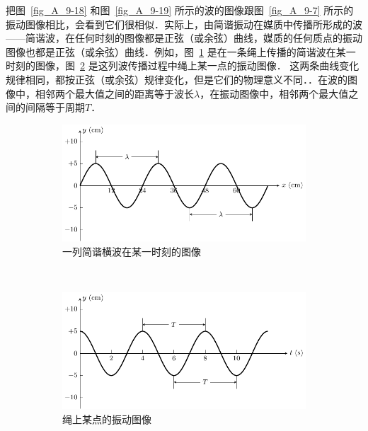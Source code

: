 把图~\ref{fig_A_9-18} 和图~\ref{fig_A_9-19} 所示的波的图像跟图~\ref{fig_A_9-7} 所示的振动图像相比，会看到它们很相似．实际上，由简谐振动在媒质中传播所形成的波——简谐波，在任何时刻的图像都是正弦（或余弦）曲线，媒质的任何质点的振动图像也都是正弦（或余弦）曲线．例如，图~\ref{fig_A_9-20a} 是在一条绳上传播的简谐波在某一时刻的图像，图~\ref{fig_A_9-20b} 是这列波传播过程中绳上某一点的振动图像．
这两条曲线变化规律相同，都按正弦（或余弦）规律变化，但是它们的物理意义不同．．在波的图像中，相邻两个最大值之间的距离等于波长$\lambda$，在振动图像中，相邻两个最大值之间的间隔等于周期$T$．
\begin{figure}[htbp]
    \centering
    \begin{subfigure}{0.8\linewidth}
        \centering
        \includegraphics{fig/A/9-20a.pdf}
        \caption{一列简谐横波在某一时刻的图像}\label{fig_A_9-20a}
    \end{subfigure}
    \\
    \begin{subfigure}{0.8\linewidth}
        \centering
        \includegraphics{fig/A/9-20b.pdf}
        \caption{绳上某点的振动图像}\label{fig_A_9-20b}
    \end{subfigure}
    \caption{}\label{fig_A_9-20}
\end{figure}

